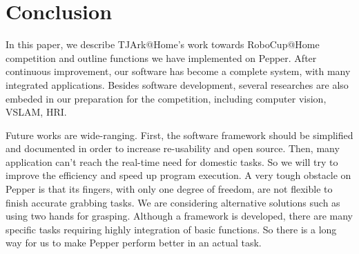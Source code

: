 \section{Conclusion}

In this paper, we describe TJArk@Home's work towards RoboCup@Home competition and outline functions we have implemented on Pepper.
After continuous improvement, our software has become a complete system, with many integrated applications.
Besides software development, several researches are also embeded in our preparation for the competition, including computer vision, VSLAM, HRI.

Future works are wide-ranging.
First, the software framework should be simplified and documented in order to increase re-usability and open source.
Then, many application can't reach the real-time need for domestic tasks. So we will try to improve the efficiency and speed up program execution.
A very tough obstacle on Pepper is that its fingers, with only one degree of freedom, are not flexible to finish accurate grabbing tasks.
We are considering alternative solutions such as using two hands for grasping.
Although a framework is developed, there are many specific tasks requiring highly integration of basic functions.
So there is a long way for us to make Pepper perform better in an actual task.
